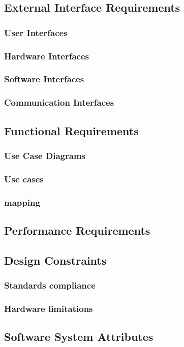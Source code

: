 \documentclass{article}
\begin{document}
\subsection{External Interface Requirements}
\subsubsection{User Interfaces}
\subsubsection{Hardware Interfaces}
\subsubsection{Software Interfaces}
\subsubsection{Communication Interfaces}
\subsection{Functional Requirements}
\subsubsection{Use Case Diagrams}
\subsubsection{Use cases}
\subsubsection{mapping}
\subsection{Performance Requirements}
\subsection{Design Constraints}
\subsubsection{Standards compliance}
\subsubsection{Hardware limitations}
\subsection{Software System Attributes}
\end{document}

